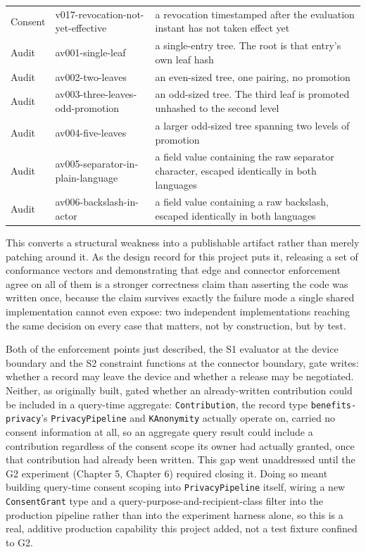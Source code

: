 \begin{table}[H]
\begin{tabularx}{\textwidth}{llX}
Consent & v017-revocation-not-yet-effective & a revocation timestamped after the evaluation instant has not taken effect yet \\
Audit & av001-single-leaf & a single-entry tree. The root is that entry's own leaf hash \\
Audit & av002-two-leaves & an even-sized tree, one pairing, no promotion \\
Audit & av003-three-leaves-odd-promotion & an odd-sized tree. The third leaf is promoted unhashed to the second level \\
Audit & av004-five-leaves & a larger odd-sized tree spanning two levels of promotion \\
Audit & av005-separator-in-plain-language & a field value containing the raw separator character, escaped identically in both languages \\
Audit & av006-backslash-in-actor & a field value containing a raw backslash, escaped identically in both languages \\
\bottomrule
\end{tabularx}
\end{table}

This converts a structural weakness into a publishable artifact rather than merely patching around it. As the design record for this project puts it, releasing a set of conformance vectors and demonstrating that edge and connector enforcement agree on all of them is a stronger correctness claim than asserting the code was written once, because the claim survives exactly the failure mode a single shared implementation cannot even expose: two independent implementations reaching the same decision on every case that matters, not by construction, but by test.

Both of the enforcement points just described, the S1 evaluator at the device boundary and the S2 constraint functions at the connector boundary, gate writes: whether a record may leave the device and whether a release may be negotiated. Neither, as originally built, gated whether an already-written contribution could be included in a query-time aggregate: \texttt{Contribution}, the record type \texttt{benefits-privacy}'s \texttt{PrivacyPipeline} and \texttt{KAnonymity} actually operate on, carried no consent information at all, so an aggregate query result could include a contribution regardless of the consent scope its owner had actually granted, once that contribution had already been written. This gap went unaddressed until the G2 experiment (Chapter 5, Chapter 6) required closing it. Doing so meant building query-time consent scoping into \texttt{PrivacyPipeline} itself, wiring a new \texttt{ConsentGrant} type and a query-purpose-and-recipient-class filter into the production pipeline rather than into the experiment harness alone, so this is a real, additive production capability this project added, not a test fixture confined to G2.

